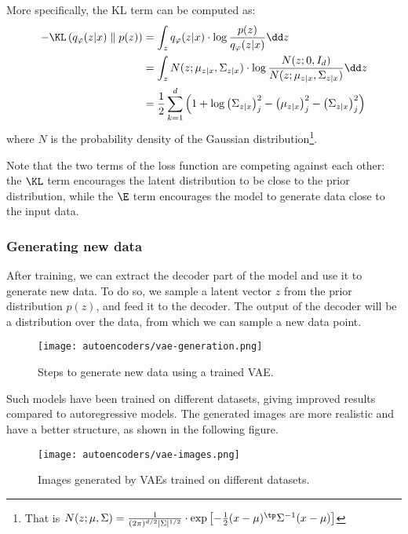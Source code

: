 More specifically, the KL term can be computed as:
\begin{equation*}
    \begin{aligned}
        -\KL\left(q_\varphi(z|x)\parallel p(z)\right) &= \int_z q_\varphi(z|x)\cdot\log\frac{p(z)}{q_\varphi(z|x)}\dd z\\
        &= \int_z N(z; \mu_{z|x}, \Sigma_{z|x})\cdot\log\frac{N(z; 0, I_d)}{N(z; \mu_{z|x}, \Sigma_{z|x})}\dd z\\
        &= \frac{1}{2}\sum_{k=1}^d \left(1 + \log\left(\Sigma_{z|x}\right)^2_j - \left(\mu_{z|x}\right)^2_j - \left(\Sigma_{z|x}\right)^2_j\right)
    \end{aligned}
\end{equation*}
where $N$ is the probability density of the Gaussian distribution\footnote{That is $N(z; \mu, \Sigma) = \frac{1}{(2\pi)^{d/2}|\Sigma|^{1/2}}\cdot\exp\left[-\frac{1}{2}(x-\mu)^\tp\Sigma^{-1}(x-\mu)\right]$}.

Note that the two terms of the loss function are competing against each other: the $\KL$ term encourages the latent distribution to be close to the prior distribution, while the $\E$ term encourages the model to generate data close to the input data.

\subsubsection{Generating new data}
After training, we can extract the decoder part of the model and use it to generate new data. To do so, we sample a latent vector $z$ from the prior distribution $p(z)$, and feed it to the decoder. The output of the decoder will be a distribution over the data, from which we can sample a new data point.
\begin{figure}[H]
    \centering
    \texttt{[image: autoencoders/vae-generation.png]}
    \caption{Steps to generate new data using a trained VAE.}
\end{figure}

Such models have been trained on different datasets, giving improved results compared to autoregressive models. The generated images are more realistic and have a better structure, as shown in the following figure.
\begin{figure}[H]
    \centering
    \texttt{[image: autoencoders/vae-images.png]}
    \caption{Images generated by VAEs trained on different datasets.}
\end{figure}

